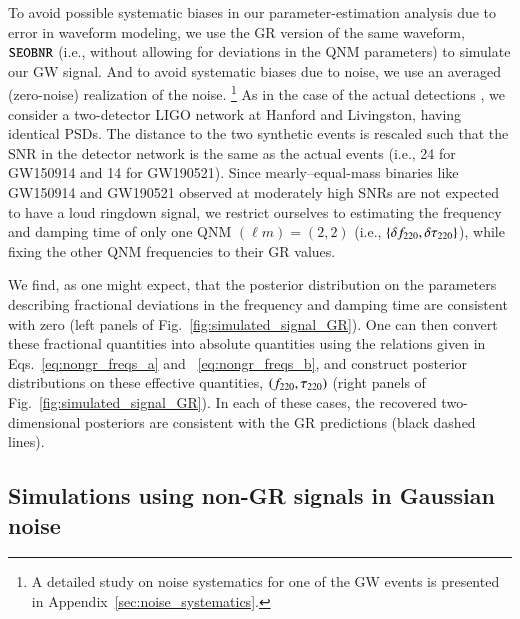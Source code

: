 
To avoid possible systematic biases in our parameter-estimation analysis
due to error in waveform modeling, we use the GR version of the same waveform,
$\texttt{SEOBNR}$ (i.e., without allowing for deviations in the QNM parameters) to
simulate our GW signal. And to avoid systematic biases due to noise,
we use an averaged (zero-noise) realization of the noise. \footnote{A detailed
study on noise systematics for one of the GW events is presented in
Appendix~\ref{sec:noise_systematics}.}  As in the case of the actual
detections , we consider a two-detector LIGO network at
Hanford and Livingston, having identical PSDs. The distance to the two 
synthetic events is rescaled such that the SNR in the detector network
is the same as the actual events (i.e., 24 for GW150914 and 14
for GW190521). Since mearly--equal-mass binaries like GW150914 and
GW190521 observed at moderately high SNRs are not expected to have a
loud ringdown signal, we restrict ourselves to estimating the
frequency and damping time of only one QNM $(\ell m) = (2,2)$ (i.e.,
$\{\delta f_{\text{220}},\delta \tau_{\text{220}}\}$), while fixing the other QNM frequencies to
their GR values.

We find, as one might expect, that the posterior distribution on the
parameters describing fractional deviations in the frequency and
damping time are consistent with zero (left panels of
Fig.~\ref{fig:simulated_signal_GR}). One can then convert these
fractional quantities into absolute quantities using the relations
given in Eqs.~\ref{eq:nongr_freqs_a} and ~\ref{eq:nongr_freqs_b}, and
construct posterior distributions on these effective quantities,
$(f_{\text{220}}, \tau_{\text{220}})$ (right panels of
Fig.~\ref{fig:simulated_signal_GR}). In each of these cases, the recovered
two-dimensional posteriors are consistent with the GR predictions
(black dashed lines).


\subsection{Simulations using non-GR signals in Gaussian noise} \label{ssec:ngr_signal}

